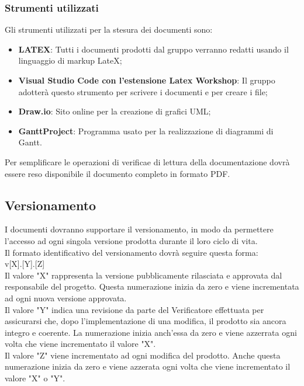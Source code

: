 \subsubsection{Strumenti utilizzati}
Gli strumenti utilizzati per la stesura dei documenti sono:
\begin{itemize}
    \item \textbf{LATEX}: Tutti i documenti prodotti dal gruppo verranno redatti usando il linguaggio di markup LateX;
    \item \textbf{Visual Studio Code con l’estensione Latex Workshop}: Il gruppo adotterà questo strumento per scrivere i documenti e per creare i file;
    \item \textbf{Draw.io}: Sito online per la creazione di grafici UML;
    \item \textbf{GanttProject}: Programma usato per la realizzazione di diagrammi di Gantt.
\end{itemize}
Per semplificare le operazioni di verifica\glo e di lettura della documentazione dovrà essere reso disponibile il documento completo in formato PDF.

\subsection{Versionamento}
I documenti dovranno supportare il versionamento, in modo da permettere l’accesso ad ogni singola versione prodotta durante il loro ciclo di vita. \\
Il formato identificativo del versionamento dovrà seguire questa forma: \\
v[X].[Y].[Z] \\
Il valore "X" rappresenta la versione pubblicamente rilasciata e approvata dal responsabile del progetto. Questa numerazione inizia da zero e viene incrementata ad ogni nuova versione approvata. \\
Il valore "Y" indica una revisione da parte del Verificatore effettuata per assicurarsi che, dopo l'implementazione di una modifica, il prodotto sia ancora integro e coerente. La numerazione inizia anch'essa da zero e viene azzerrata ogni volta che viene incrementato il valore "X". \\
Il valore "Z" viene incrementato ad ogni modifica del prodotto. Anche questa numerazione inizia da zero e viene azzerata ogni volta che viene incrementato il valore "X" o "Y". \\
